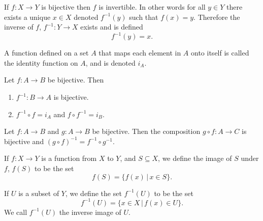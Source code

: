 \documentclass{article}
\begin{document}
\begin{lemma}
	If \(f:X\rightarrow Y\) is bijective then \(f\) is invertible. In other words for all \(y\in Y\) there exists a unique \(x\in X\) denoted \(f^{-1}(y)\) such that \(f(x)=y\). Therefore the inverse of \(f\), \(f^{-1}:Y\rightarrow X\) exists and is defined
	\begin{equation*}
		f^{-1}(y)=x.
	\end{equation*}
\end{lemma}
\begin{definition}
	A function defined on a set \(A\) that maps each element in \(A\) onto itself is called the identity function on \(A\), and is denoted \(i_A\).
\end{definition}
\begin{proposition}
	Let \(f:A\rightarrow B\) be bijective. Then
	\begin{enumerate}
		\item \(f^{-1}:B\rightarrow A\) is bijective.
		\item \(f^{-1}\circ f=i_A\) and \(f\circ f^{-1}=i_B\).
	\end{enumerate}
\end{proposition}
\begin{theorem}
	Let \(f:A\rightarrow B\) and \(g:A\rightarrow B\) be bijective. Then the composition \(g\circ f:A\rightarrow C\) is bijective and \((g\circ f)^{-1}=f^{-1}\circ g^{-1}\).
\end{theorem}
%
\begin{definition}[Image]
	If \(f:X\rightarrow Y\) is a function from \(X\) to \(Y\), and \(S\subseteq X\), we define the image of \(S\) under \(f\), \(f(S)\) to be the set
	\begin{equation*}
		f(S)=\{f(x)\,|\,x\in S\}.
	\end{equation*}
\end{definition}
\begin{definition}
	If \(U\) is a subset of \(Y\), we define the set \(f^{-1}(U)\) to be the set
	\begin{equation*}
		f^{-1}(U)=\{x\in X\,|\,f(x)\in U\}.
	\end{equation*}
	We call \(f^{-1}(U)\) the inverse image of \(U\).
\end{definition}
\end{document}
